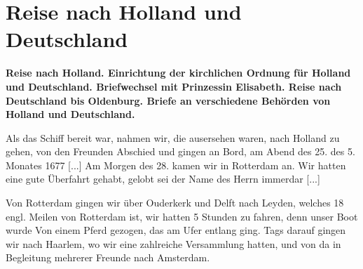 
\chapter[Reise nach Holland und Deutschland]{Reise nach Holland und Deutschland}

\begin{center}
\textbf{Reise nach Holland. Einrichtung der kirchlichen Ordnung für
Holland und Deutschland. Briefwechsel mit Prinzessin Elisabeth.
Reise nach Deutschland bis Oldenburg. Briefe an verschiedene
Behörden von Holland und Deutschland.}
\end{center}


Als das Schiff bereit war, nahmen wir, die ausersehen waren,
nach Holland zu gehen, von den Freunden Abschied und gingen
an Bord, am Abend des 25. des 5. Monates 1677 [...]
Am Morgen des 28. kamen wir in Rotterdam an. Wir
hatten eine gute Überfahrt gehabt, gelobt sei der Name des Herrn
immerdar [...]

Von Rotterdam gingen wir über Ouderkerk und Delft nach
Leyden, welches 18 engl. Meilen von Rotterdam ist, wir hatten
5 Stunden zu fahren, denn unser Boot wurde Von einem Pferd
gezogen, das am Ufer entlang ging. Tags darauf gingen wir
nach Haarlem, wo wir eine zahlreiche Versammlung hatten, und
von da in Begleitung mehrerer Freunde nach Amsterdam.

